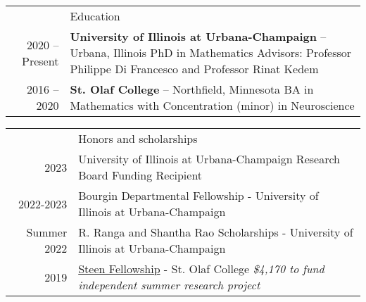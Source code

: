 \documentclass[letterpaper, 11pt]{article}
\newcommand{\headingfont}{\Large\color{Red}}
\newenvironment{SectionTable}[1]{
	\renewcommand*{\arraystretch}{1.7}
	\setlength{\tabcolsep}{10pt}
	\begin{longtable}{Rp{5.2in}} & #1 \\}
	{\end{longtable}\vspace{-.3cm}}
\newenvironment{SectionTableSingleSpace}[1]{
	\renewcommand*{\arraystretch}{1.2}
	\setlength{\tabcolsep}{10pt}
	\begin{longtable}{Rp{5.2in}} & #1 \\[0.6em]}
	{\end{longtable}\vspace{-.3cm}}
\begin{document}
	\begin{SectionTable}{\headingfont Education}
		2020 -- Present & 
		\textbf{University of Illinois at Urbana-Champaign} -- Urbana, Illinois \newline
		PhD in Mathematics \newline 
		Advisors: Professor Philippe Di Francesco and Professor Rinat Kedem %
		\\
		
		2016 -- 2020 & 
		\textbf{St. Olaf College} -- Northfield, Minnesota \newline
		BA in Mathematics with Concentration (minor) in Neuroscience \newline 
		\\
		
		
		
		
	\end{SectionTable}
	
	
	\begin{SectionTableSingleSpace}{\headingfont Honors and scholarships}
		2023 &
		University of Illinois at Urbana-Champaign Research Board Funding Recipient\newline
		\\

		2022-2023 &
		Bourgin Departmental Fellowship - University of Illinois at Urbana-Champaign\newline
		\\
		
		Summer 2022 &
		R. Ranga and Shantha Rao Scholarships - University of Illinois at Urbana-Champaign  \newline
		\\
		

		2019 &
		\href{https://wp.stolaf.edu/curi/summer-undergraduate-research}{Steen Fellowship} - St. Olaf College \newline 
		\textit{\$4,170  to fund independent summer research project}
		\\
		
		
	\end{SectionTableSingleSpace}
	
\end{document}

